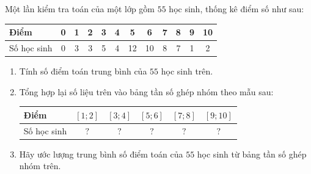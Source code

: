 \begin{ex}%
	Một lần kiểm tra toán của một  lớp gồm $55$ học sinh, thống kê điểm số như sau:
	\begin{center}
		\begin{tabular}{|l|c|c|c|c|c|c|c|c|c|c|c|}
			\hline Điểm &0&1&2&3&4&5&6&7&8&9&10\\ 
			\hline  Số học sinh &0&3&3&5&4&12&10&8&7&1&2\\
			\hline 
		\end{tabular}
	\end{center}
	\begin{enumerate}
		\item Tính số điểm toán trung bình của  $55$ học sinh trên.
		\item Tổng hợp lại số liệu trên vào bảng tần số ghép nhóm theo mẫu  sau:
		\begin{center}
			\begin{tabular}{|l|c|c|c|c|c|}
				\hline Điểm & $[1; 2]  $ & $[3; 4] $ & $[5; 6] $ & $[7; 8] $ & $[9; 10] $ \\
				\hline Số học sinh & $ ? $ & $ ? $ & $ ? $ & $ ? $ & $  ? $ \\
				 \hline
			\end{tabular}
		\end{center}
		\item Hãy  ước lượng trung bình số điểm toán của $55$ học sinh từ bảng tần số ghép nhóm trên.
	\end{enumerate}
\end{ex}
